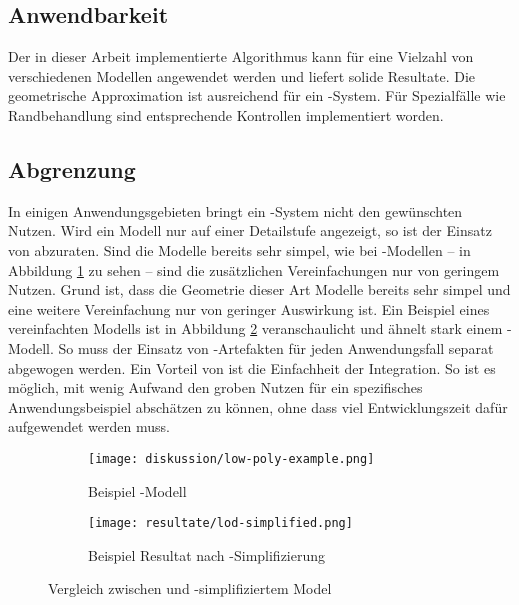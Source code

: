 \subsection{Anwendbarkeit}

Der in dieser Arbeit implementierte Algorithmus kann für eine Vielzahl von verschiedenen Modellen angewendet werden und liefert solide Resultate. Die geometrische Approximation ist ausreichend für ein -System. Für Spezialfälle wie Randbehandlung sind entsprechende Kontrollen implementiert worden.

\subsection{Abgrenzung}

In einigen Anwendungsgebieten bringt ein -System nicht den gewünschten Nutzen. Wird ein Modell nur auf einer Detailstufe angezeigt, so ist der Einsatz von  abzuraten. Sind die Modelle bereits sehr simpel, wie bei -Modellen – in Abbildung \ref{fig:lowPolyExample} zu sehen – sind die zusätzlichen Vereinfachungen nur von geringem Nutzen. Grund ist, dass die Geometrie dieser Art Modelle bereits sehr simpel und eine weitere Vereinfachung nur von geringer Auswirkung ist. Ein Beispiel eines vereinfachten Modells ist in Abbildung \ref{fig:lodModelSimplified} veranschaulicht und ähnelt stark einem -Modell.
So muss der Einsatz von -Artefakten für jeden Anwendungsfall separat abgewogen werden. Ein Vorteil von  ist die Einfachheit der Integration. So ist es möglich, mit wenig Aufwand den groben Nutzen für ein spezifisches Anwendungsbeispiel abschätzen zu können, ohne dass viel Entwicklungszeit dafür aufgewendet werden muss.

\begin{figure}[H]
  \begin{subfigure}{.5\textwidth}
    \centering
    \texttt{[image: diskussion/low-poly-example.png]}
    \caption{Beispiel -Modell}
    \label{fig:lowPolyExample}
  \end{subfigure}%
  \begin{subfigure}{.5\textwidth}
    \centering
    \texttt{[image: resultate/lod-simplified.png]}
    \caption{Beispiel Resultat nach -Simplifizierung}
    \label{fig:lodModelSimplified}
  \end{subfigure}
  \caption{Vergleich zwischen  und -simplifiziertem Model}
  \label{fig:comparisonLowPolyAndLOD}
\end{figure}

